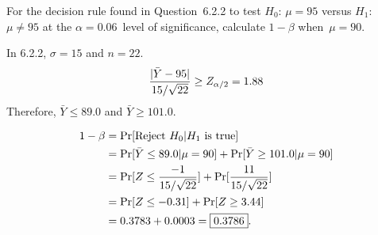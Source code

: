 \begin{problem}
  For the decision rule found in Question~6.2.2 to test $H_0$: ${\mu = 95}$ versus $H_1$: ${\mu \ne 95}$ at the ${\alpha = 0.06}$~level of significance, calculate ${1 - \beta}$ when~${\mu = 90}$.
\end{problem}

In 6.2.2, ${\sigma = 15}$ and ${n =22}$.
\begin{equation}
  \frac{\lvert\bar{Y} - 95\rvert}{15 / \sqrt{22}} \geq Z_{\alpha/2} = 1.88
\end{equation}
\noindent
Therefore, ${\bar{Y} \leq 89.0}$ and ${\bar{Y} \geq 101.0}$.

\noindent
\begin{align*}
  1 - \beta &= \Pr\lbrack\text{Reject } H_0 \vert H_1 \text{ is true}\rbrack \\
            &= \Pr\lbrack\bar{Y} \leq 89.0 \vert \mu = 90\rbrack + \Pr\lbrack\bar{Y} \geq 101.0 \vert \mu = 90\rbrack \\
            &= \Pr\lbrack Z \leq \frac{-1}{15 / \sqrt{22}}\rbrack + \Pr\lbrack\frac{11}{15 / \sqrt{22}}\rbrack \\
            &= \Pr\lbrack Z \leq -0.31\rbrack + \Pr\lbrack Z \geq 3.44\rbrack \\
            &= 0.3783 + 0.0003 = \boxed{0.3786}\text{.}
\end{align*}
